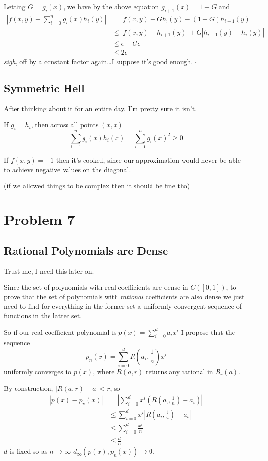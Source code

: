 \documentclass[12pt]{article}
\begin{document}
Letting $G=g_i(x)$, we have by the above equation $g_{i+1}(x)=1-G$ and
\begin{align*}
  \left|f(x, y) - \sum_{i=0}^{n} g_i(x)h_i(y)\right|
  &= |f(x, y) - Gh_i(y) - (1-G)h_{i+1}(y)| \\
  &\le |f(x, y) - h_{i+1}(y)| + G|h_{i+1}(y)-h_i(y)| \\
  &\le \epsilon + G\epsilon \\
  &\le 2\epsilon
\end{align*}
\textit{sigh}, off by a constant factor again\dots I suppose it's good enough. $\square$

\subsection{Symmetric Hell}

After thinking about it for an entire day, I'm pretty sure it isn't.

If $g_i=h_i$, then across all points $(x, x)$
\[\sum_{i=1}^{n} g_i(x)h_i(x)=\sum_{i=1}^{n} g_i(x)^2 \ge 0\]

If $f(x, y)=-1$ then it's cooked, since our approximation would never
be able to achieve negative values on the diagonal.

(if we allowed things to be complex then it should be fine tho)

\pagebreak

\section{Problem 7}

\subsection{Rational Polynomials are Dense}

Trust me, I need this later on.

Since the set of polynomials with real coefficients are dense in $C([0, 1])$,
to prove that the set of polynomials with \textit{rational} coefficients
are also dense we just need to find for everything in the former set
a uniformly convergent sequence of functions in the latter set.

So if our real-coefficient polynomial is $p(x)=\sum_{i=0}^{d} a_ix^i$
I propose that the sequence
\[p_n(x)=\sum_{i=0}^{d} R\left(a_i, \frac{1}{n}\right) x^i\]
uniformly converges to $p(x)$, where $R(a, r)$ returns any rational in $B_r(a)$.

By construction, $\left|R(a, r) - a\right| < r$, so
\begin{align*}
  |p(x)-p_n(x)|
   & = \left|\sum_{i=0}^{d} x^i\left(R\left(a_i, \frac{1}{n}\right) - a_i\right)\right| \\
   & \le \sum_{i=0}^{d} x^i \left|R\left(a_i, \frac{1}{n}\right) - a_i\right|           \\
   & \le \sum_{i=0}^{d} \frac{x^i}{n}                                                   \\
   & \le \frac{d}{n}
\end{align*}
$d$ is fixed so as $n \to \infty$ $d_\infty(p(x), p_n(x)) \to 0$.
\end{document}
